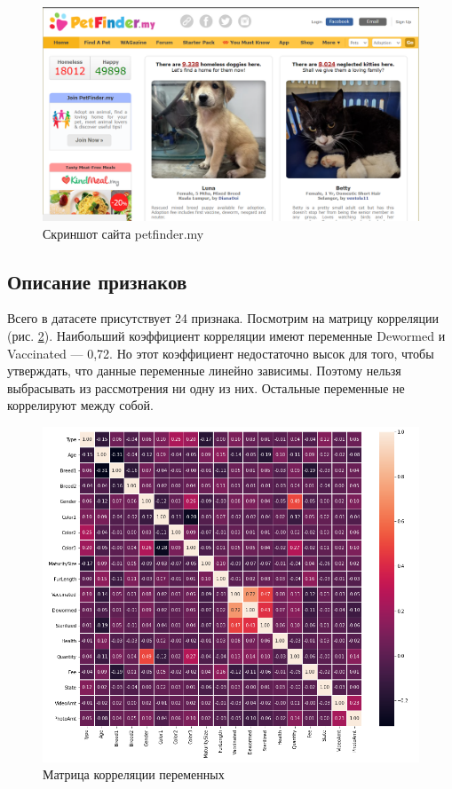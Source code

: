 \documentclass[14pt]{mmcs_article}
\begin{document}
\begin{figure}[H]
	\centering
	\includegraphics[scale=0.4]{petfinder.png}
	\caption{Скриншот сайта petfinder.my}\label{analyse:petfinder}
\end{figure}


\subsection{Описание признаков}

Всего в датасете присутствует 24 признака. Посмотрим на матрицу корреляции (рис. \ref{analyse:corr}). Наибольший коэффициент корреляции имеют переменные Dewormed и Vaccinated --- 0,72. Но этот коэффициент недостаточно высок для того, чтобы утверждать, что данные переменные линейно зависимы. Поэтому нельзя выбрасывать из рассмотрения ни одну из них. Остальные переменные не коррелируют между собой.

\begin{figure}[H]
	\centering
	\includegraphics[scale=0.55]{corr.png}
	\caption{Матрица корреляции переменных}\label{analyse:corr}
\end{figure}
\end{document}
